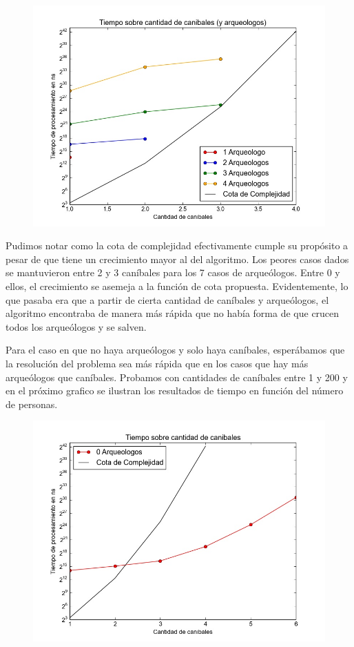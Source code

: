   \begin{figure}[H]
      \begin{center}
        \includegraphics[width=1.1\columnwidth]{imagenes/ej1exp1NuevaVersion.jpeg}
        \caption{}
      \end{center}
  \end{figure}

  Pudimos notar como la cota de complejidad efectivamente cumple su propósito a pesar de que tiene un crecimiento mayor al del algoritmo. Los peores casos dados se mantuvieron entre 2 y 3 caníbales para los 7 casos de arqueólogos. Entre 0 y ellos, el crecimiento se asemeja a la función de cota propuesta.
  Evidentemente, lo que pasaba era que a partir de cierta cantidad de caníbales y arqueólogos, el algoritmo encontraba de manera más rápida que no había forma de que crucen todos los arqueólogos y se salven.

  Para el caso en que no haya arqueólogos y solo haya caníbales, esperábamos que la resolución del problema sea más rápida que en los casos que hay más arqueólogos que caníbales. Probamos con cantidades de caníbales entre 1 y 200 y en el próximo grafico se ilustran los resultados de tiempo en función del número de personas.

  \begin{figure}[H]
      \begin{center}
        \includegraphics[width=0.7\columnwidth]{imagenes/ej1exp2NuevaVersion.jpeg}
        \caption{}
      \end{center}
  \end{figure}

